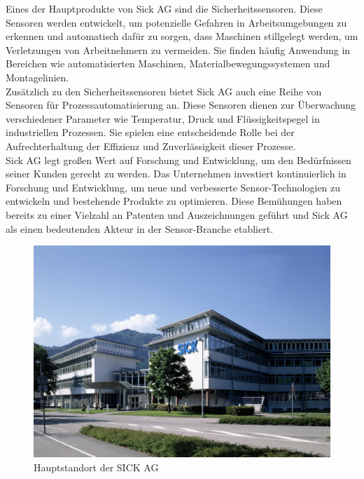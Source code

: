 Eines der Hauptprodukte von Sick AG sind die Sicherheitssensoren. Diese Sensoren werden entwickelt, um potenzielle Gefahren in Arbeitsumgebungen zu erkennen und automatisch dafür zu sorgen, dass Maschinen stillgelegt werden, um Verletzungen von Arbeitnehmern zu vermeiden. Sie finden häufig Anwendung in Bereichen wie automatisierten Maschinen, Materialbewegungssystemen und Montagelinien.\\

Zusätzlich zu den Sicherheitssensoren bietet Sick AG auch eine Reihe von Sensoren für Prozessautomatisierung an. Diese Sensoren dienen zur Überwachung verschiedener Parameter wie Temperatur, Druck und Flüssigkeitspegel in industriellen Prozessen. Sie spielen eine entscheidende Rolle bei der Aufrechterhaltung der Effizienz und Zuverlässigkeit dieser Prozesse.\\

Sick AG legt großen Wert auf Forschung und Entwicklung, um den Bedürfnissen seiner Kunden gerecht zu werden. Das Unternehmen investiert kontinuierlich in Forschung und Entwicklung, um neue und verbesserte Sensor-Technologien zu entwickeln und bestehende Produkte zu optimieren. Diese Bemühungen haben bereits zu einer Vielzahl an Patenten und Auszeichnungen geführt und Sick AG als einen bedeutenden Akteur in der Sensor-Branche etabliert.\\

\begin{figure}[htp]
    \centering
    \includegraphics[width=(\textwidth/2)]{Bild/SICK_Headquarter.jpg}
    \caption{Hauptstandort der SICK AG\cite{.08.10.2016}}
    \label{fig:Hauptstandort der SICK AG}
\end{figure}
\fi
